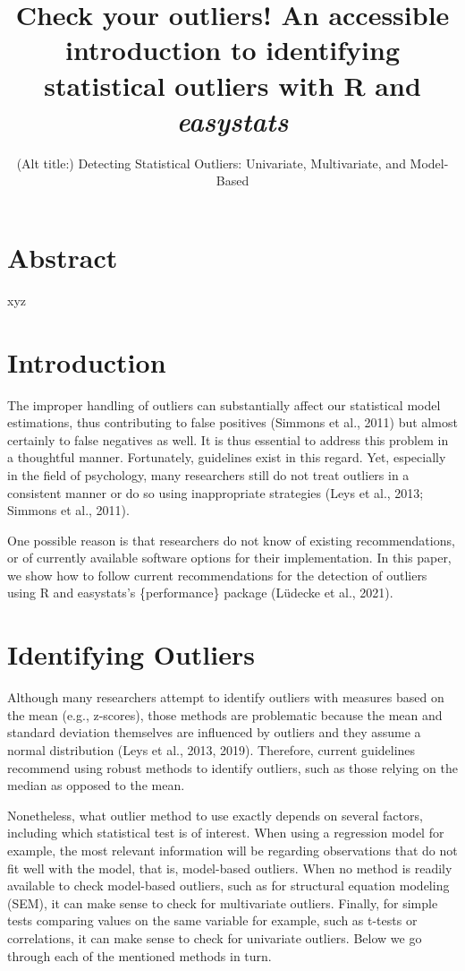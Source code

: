 \documentclass[
]{article}
\title{Check your outliers! An accessible introduction to identifying
statistical outliers with R and \emph{easystats}}
\subtitle{(Alt title:) Detecting Statistical Outliers: Univariate,
Multivariate, and Model-Based}
\author{}
\date{\vspace{-2.5em}}
\begin{document}
\maketitle

\hypertarget{abstract}{%
\section{Abstract}\label{abstract}}

xyz

\hypertarget{introduction}{%
\section{Introduction}\label{introduction}}

The improper handling of outliers can substantially affect our
statistical model estimations, thus contributing to false positives
(Simmons et al., 2011) but almost certainly to false negatives as well.
It is thus essential to address this problem in a thoughtful manner.
Fortunately, guidelines exist in this regard. Yet, especially in the
field of psychology, many researchers still do not treat outliers in a
consistent manner or do so using inappropriate strategies (Leys et al.,
2013; Simmons et al., 2011).

One possible reason is that researchers do not know of existing
recommendations, or of currently available software options for their
implementation. In this paper, we show how to follow current
recommendations for the detection of outliers using R and easystats's
\{performance\} package (Lüdecke et al., 2021).

\hypertarget{identifying-outliers}{%
\section{Identifying Outliers}\label{identifying-outliers}}

Although many researchers attempt to identify outliers with measures
based on the mean (e.g., z-scores), those methods are problematic
because the mean and standard deviation themselves are influenced by
outliers and they assume a normal distribution (Leys et al., 2013,
2019). Therefore, current guidelines recommend using robust methods to
identify outliers, such as those relying on the median as opposed to the
mean.

Nonetheless, what outlier method to use exactly depends on several
factors, including which statistical test is of interest. When using a
regression model for example, the most relevant information will be
regarding observations that do not fit well with the model, that is,
model-based outliers. When no method is readily available to check
model-based outliers, such as for structural equation modeling (SEM), it
can make sense to check for multivariate outliers. Finally, for simple
tests comparing values on the same variable for example, such as t-tests
or correlations, it can make sense to check for univariate outliers.
Below we go through each of the mentioned methods in turn.
\end{document}
